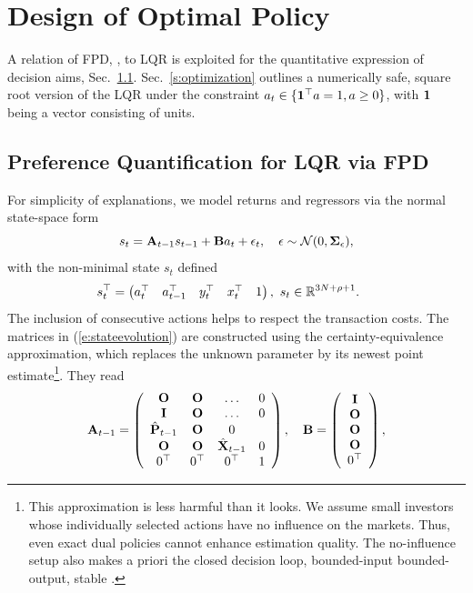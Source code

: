 \section{Design of Optimal Policy}\label{s:lqrsection} A relation of FPD, \cite{Kar:960280,Kar:20}, to LQR is exploited for the quantitative expression of decision aims, Sec.\ \ref{s:FPD}. Sec.\ \ref{s:optimization} outlines a numerically safe, square root version of the LQR under the constraint $a_{t}\in \{\mathbf{1}^{\top}a= 1, a\geq 0\}$, with $\mathbf{1}$ being a vector consisting of units.

\subsection{Preference Quantification for LQR via FPD} \label{s:FPD}
For simplicity of explanations, we model returns and regressors via the normal state-space form
\begin{equation}\label{e:stateevolution}
s_{t} = \mathbf{A}_{t-1}s_{t-1} + \mathbf{B}a_{t} + \epsilon_{t}, \quad \epsilon\sim\mathcal{N}(0, \mathbf{\Sigma}_{\epsilon}),
\end{equation}
with the non-minimal state $s_{t}$ defined
\begin{equation*}
\hspace*{-3ex}s_{t}^{\top} = \begin{pmatrix}
    a_{t}^{\top} & a_{t-1}^{\top}& y_{t}^{\top} & x_{t}^{\top} & 1
\end{pmatrix},\ s_{t} \in \mathbb{R}^{3N+\rho + 1}.
\end{equation*}
The inclusion of consecutive actions helps to respect the transaction costs.  The matrices in (\ref{e:stateevolution}) are constructed using the certainty-equivalence approximation, which replaces the unknown parameter by its newest point estimate\footnote{This approximation is less harmful than it looks. We assume small investors whose individually selected actions have no influence on the markets. Thus, even exact dual policies \cite{Fel:6061} cannot enhance estimation quality. The no-influence setup also makes a priori the closed decision loop, bounded-input bounded-output, stable \cite{KelBra:23}.}. They read
\begin{equation}
    \label{e:evolutionmatrices}
    \mathbf{A}_{t-1} = \left(\begin{array}{cccc}
        \mathbf{O} & \mathbf{O} &\dots   &  0\\
        \mathbf{I}  & \mathbf{O} & \dots&0 \\
        \hat{\mathbf{P}}_{t-1} & \mathbf{O}&0 \\
        \mathbf{O} & \mathbf{O} & \hat{\mathbf{X}}_{t-1}&0\\
         0^{\top} &  0^{\top} &  0^{\top} &1
    \end{array}\right),
    \quad \mathbf{B} =
    \left(\begin{array}{c}
        \mathbf{I} \\
        \mathbf{O} \\
        \mathbf{O} \\
        \mathbf{O}\\
           0^{\top}
    \end{array}\right),
\end{equation}
